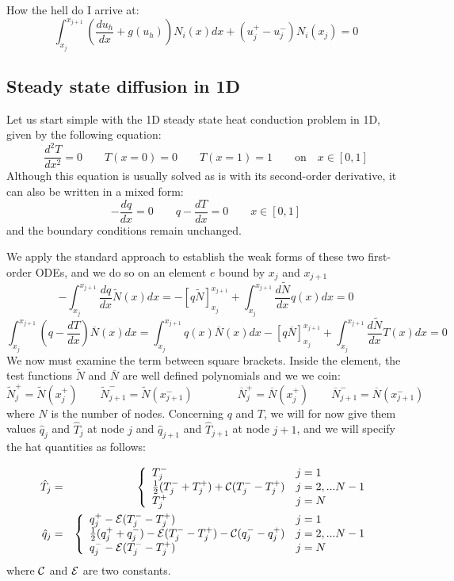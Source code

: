 How the hell do I arrive at:
\[
\int_{x_j}^{x_{j+1}} \left( \frac{d u_h}{dx} + g(u_h) \right) N_i(x) dx + (u_j^+-u_j^-) N_i(x_j) = 0
\]

\newpage
\subsection{Steady state diffusion in 1D}

Let us start simple with the 1D steady state heat conduction problem in 1D, given by the following 
equation:
\begin{equation}
\frac{d^2T}{dx^2}=0 \qquad T(x=0)=0 \qquad T(x=1)=1 \qquad \text{on} \quad x\in[0,1]
\end{equation}
Although this equation is usually solved as is with its second-order derivative, it can also 
be written in a mixed form:
\[
-\frac{dq}{dx}=0 \qquad q-\frac{dT}{dx}=0 \qquad x\in[0,1]
\]
and the boundary conditions remain unchanged. 

We apply the standard approach to establish the weak forms of these two first-order ODEs, and we do so 
on an element $e$ bound by $x_j$ and $x_{j+1}$
\[
-\int_{x_j}^{x_{j+1}} \frac{dq}{dx} \tilde{N}(x) dx = -[q \tilde{N} ]_{x_j}^{x_{j+1}} 
+ \int_{x_j}^{x_{j+1}} \frac{d\tilde{N}}{dx} q(x) dx = 0
\]
\[
\int_{x_j}^{x_{j+1}}  \left( q-\frac{dT}{dx} \right) \overline{N}(x) dx
=
\int_{x_j}^{x_{j+1}}  q(x) \overline{N}(x) dx
-[ q \overline{N}  ]_{x_j}^{x_{j+1}} + \int_{x_j}^{x_{j+1}} \frac{d\tilde{N}}{dx} T(x) dx = 0
\]
We now must examine the term between square brackets. 
Inside the element, the test functions $\tilde{N}$ and $\overline{N}$ are well defined polynomials
and we we coin:
\[
\tilde{N}_j^+=\tilde{N}(x_j^+)
\qquad
\tilde{N}_{j+1}^-=\tilde{N}(x_{j+1}^-)
\qquad
\qquad
\overline{N}_j^+=\overline{N}(x_j^+)
\qquad
\overline{N}_{j+1}^-=\overline{N}(x_{j+1}^-)
\]
where $N$ is the number of nodes.
Concerning $q$ and $T$, we will for now  give them values $\hat{q}_j$ and $\hat{T}_j$ at node $j$
and $\hat{q}_{j+1}$ and $\hat{T}_{j+1}$ at node $j+1$, and we will specify the hat quantities as follows:

\begin{eqnarray}
\hat{T}_j &=&
\left\{
\begin{array}{ll}
T_j^-   & j=1 \\ 
\frac{1}{2}(T_j^-+T_j^+) + {\cal C} (T_j^- - T_j^+) & j=2,...N-1\\
T_j^+    & j=N \\ 
\end{array}
\right. \nonumber\\
\hat{q}_j &=&
\left\{
\begin{array}{ll}
q_j^+ -{\cal E} (T_j^--T_j^+)  & j=1 \\ 
\frac{1}{2}(q_j^+ + q_j^-) - {\cal E} (T_j^- - T_j^+) - {\cal C}(q_j^- - q_j^+) & j=2,...N-1\\
q_j^- -{\cal E} (T_j^--T_j^+)    & j=N \\ 
\end{array}
\right.
\end{eqnarray}
where ${\cal C}$ and ${\cal E}$ are two constants. 

